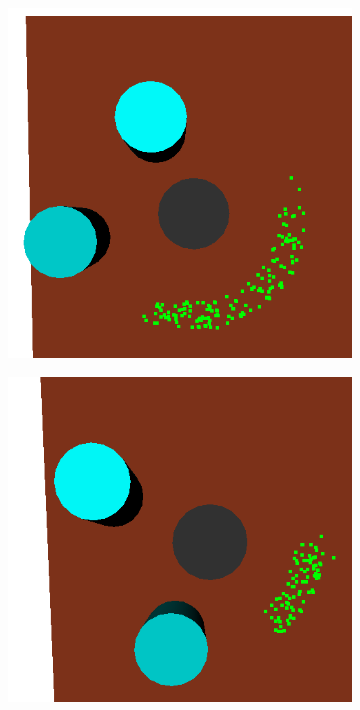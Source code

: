\begin{figure}
  \centering
  \begin{subfigure}[b]{0.3\linewidth}
    \includegraphics[width=\textwidth]{images/finalgraspnoobstr.png}
    \caption{}
  \end{subfigure}
  \begin{subfigure}[b]{0.3\linewidth}
    \includegraphics[width=\textwidth]{images/finalgraspobstr.png}

\end{subfigure}
\end{figure}

